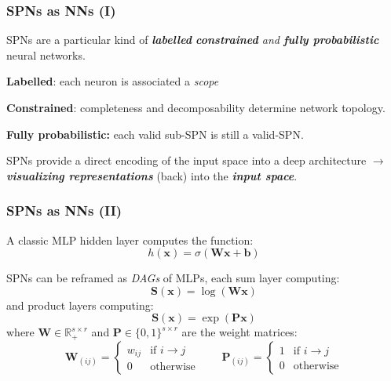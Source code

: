 \documentclass[xcolor={usenames,dvipsnames,svgnames}, compress]{beamer}
\begin{document}
\begin{frame}[t]
  \frametitle{SPNs as NNs (I)}
  SPNs are a particular kind of \emph{\textbf{labelled}
    \textbf{constrained} and \textbf{fully probabilistic}}
  neural networks.\par\bigskip
  
  \textbf{Labelled}: each neuron is associated a \emph{scope}\par
  \textbf{Constrained}: completeness and decomposability determine
  network topology.\par
  \textbf{Fully probabilistic:} each valid sub-SPN is still a
  valid-SPN.\par\bigskip
  
  SPNs provide a direct encoding of the input space into a deep
  architecture $\rightarrow$ \emph{\textbf{visualizing representations}} (back) into the \emph{\textbf{input space}}.
\end{frame}

\begin{frame}
  \frametitle{SPNs as NNs (II)}
  \small
  A classic MLP hidden layer computes the function:
  $$h(\mathbf{x}) =\sigma(\mathbf{W}\mathbf{x}+ \mathbf{b})$$

  SPNs can be reframed as \textit{DAGs} of MLPs, each sum layer
  computing:
  $$\mathbf{S}(\mathbf{x}) =
  \log(\mathbf{W}\mathbf{x})$$
  and product layers computing:
  $$\mathbf{S}(\mathbf{x}) = \exp(\mathbf{P}\mathbf{x})$$
  where
  $\mathbf{W}\in\mathbb{R}_{+}^{s\times r}$ and $\mathbf{P}\in\{0,
  1\}^{s\times r}$ are the weight matrices:
  \begin{equation*}
    \mathbf{W}_{(ij)}= \begin{cases}
      w_{ij} &\text{if $i\rightarrow j$}\\
      0& \text{otherwise}
    \end{cases}\quad\quad\mathbf{P}_{(ij)}=
    \begin{cases}
      1 &\text{if $i\rightarrow j$}\\
      0& \text{otherwise}
    \end{cases}
  \end{equation*}
\end{frame}
\end{document}

